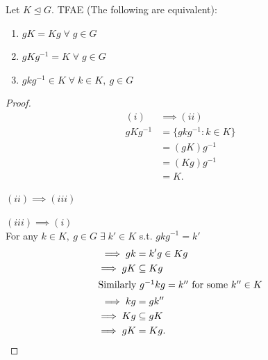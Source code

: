\begin{proposition}
\protect\hypertarget{prp:four}{}\label{prp:four}

Let \(K \trianglelefteq G\).
TFAE (The following are equivalent):

\begin{enumerate}
\def\labelenumi{\roman{enumi}.}
\item
  \(gK = Kg \; \forall \; g \in G\)
\item
  \(gKg^{-1} = K \; \forall \; g \in G\)
\item
  \(gkg^{-1} \in K \; \forall \; k \in K,\ g \in G\)
\end{enumerate}

\end{proposition}

\begin{proof}
\begin{align*}
    (i) &\implies (ii) \\
    gKg^{-1} &= \{gkg^{-1} : k \in K \} \\
    &= (gK) g^{-1} \\
    &= (Kg)g^{-1} \\
    &= K.
\end{align*}

\((ii) \implies (iii)\)

\((iii) \implies (i)\) \\
For any \(k \in K,\ g \in G \; \exists \; k' \in K\) s.t. \(gkg^{-1} = k'\)
  \begin{align*}
    \implies gk &= k'g \in Kg \\
    \implies gK &\subseteq Kg \\
    \intertext{Similarly \(g^{-1}kg = k''\) for some \(k'' \in K\)}
    \implies kg &= gk'' \\
    \implies Kg &\subseteq gK \\
    \implies gK &= Kg.
  \end{align*}
\end{proof}

